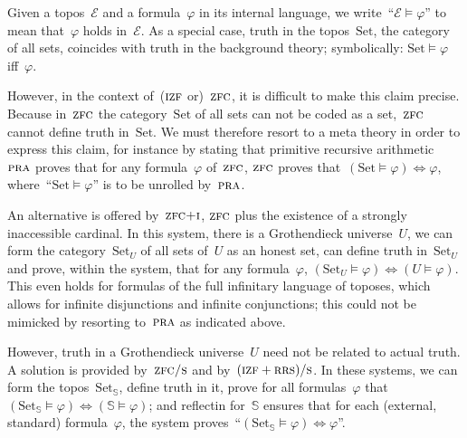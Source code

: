 \documentclass[oneside,reqno]{amsart}
\theoremstyle{definition}
\theoremstyle{plain}
\theoremstyle{remark}
\newcommand{\E}{\mathcal{E}}
\renewcommand{\SS}{\mathbb{S}}
\newcommand{\Set}{\mathrm{Set}}
\renewcommand{\_}{\mathpunct{.}\,}
\newcommand{\?}{\,{:}\,}
\newcommand{\PRA}{\textsc{pra}}
\newcommand{\IZF}{\textsc{izf}}
\newcommand{\ZFC}{\textsc{zfc}}
\newcommand{\ZFCS}{\textsc{zfc/s}}
\newcommand{\ZFCI}{\textsc{zfc+i}}
\newcommand{\RRS}{\textsc{rrs}}
\newcommand{\ES}{(\IZF+\RRS)/\textsc{s}}
\begin{document}
Given a topos~$\mathcal{E}$ and a formula~$\varphi$ in its internal language,
we write~``$\mathcal{E} \models \varphi$'' to mean that~$\varphi$ holds
in~$\E$. As a special case, truth in the topos~$\Set$, the category of all sets,
coincides with truth in the background theory; symbolically: $\Set \models
\varphi$ iff~$\varphi$.

However, in the context of~($\IZF$ or)~$\ZFC$, it is difficult to make this
claim precise. Because in~$\ZFC$ the category~$\Set$ of all sets can not be
coded as a set,~$\ZFC$ cannot define truth in~$\Set$. We must therefore resort
to a meta theory in order to express this claim, for instance by stating
that primitive recursive arithmetic~$\PRA$ proves that for any
formula~$\varphi$ of~$\ZFC$, $\ZFC$ proves that~$(\Set \models \varphi)
\Leftrightarrow \varphi$, where~``$\Set \models \varphi$'' is to be unrolled
by~$\PRA$.

An alternative is offered by~$\ZFCI$, $\ZFC$ plus the existence of a
strongly inaccessible cardinal. In this system, there is a Grothendieck
universe~$U$, we can form the category~$\Set_U$ of all sets of~$U$ as an honest
set, can define truth in~$\Set_U$ and prove, within the system, that for any
formula~$\varphi$, $(\Set_U \models \varphi) \Leftrightarrow (U \models
\varphi)$. This even holds for formulas of the full infinitary language of
toposes, which allows for infinite disjunctions and infinite conjunctions; this
could not be mimicked by resorting to~$\PRA$ as indicated above.

However, truth in a Grothendieck universe~$U$ need not be related to actual
truth. A solution is provided by~$\ZFCS$ and by~$\ES$. In these systems, we can
form the topos~$\Set_\SS$, define truth in it, prove for all formulas~$\varphi$
that~$(\Set_\SS \models \varphi) \Leftrightarrow (\SS \models \varphi)$; and
reflectin for~$\SS$ ensures that for each (external, standard)
formula~$\varphi$, the system proves~``$(\Set_\SS \models \varphi)
\Leftrightarrow \varphi$''.

\printbibliography
\end{document}
